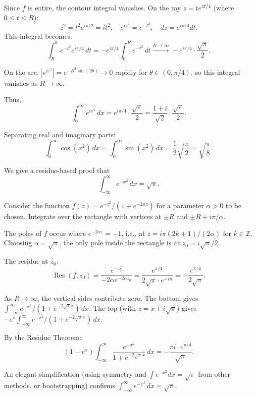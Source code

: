 \begin{example}
  Since $f$ is entire, the contour integral vanishes. On the ray $z = te^{i\pi/4}$ (where $0 \leq t \leq R$):
  \[
    z^2 = t^2 e^{i\pi/2} = it^2, \quad e^{iz^2} = e^{-t^2}, \quad dz = e^{i\pi/4} dt.
  \]
  This integral becomes:
  \[
    \int_R^0 e^{-t^2} e^{i\pi/4} \, dt = -e^{i\pi/4} \int_0^R e^{-t^2} \, dt \xrightarrow{R \to \infty} -e^{i\pi/4} \cdot \frac{\sqrt{\pi}}{2}.
  \]

  On the arc, $|e^{iz^2}| = e^{-R^2 \sin(2\theta)} \to 0$ rapidly for $\theta \in (0, \pi/4)$, so this integral vanishes as $R \to \infty$.

  Thus,
  \[
    \int_0^{\infty} e^{ix^2} \, dx = e^{i\pi/4} \cdot \frac{\sqrt{\pi}}{2} = \frac{1 + i}{\sqrt{2}} \cdot \frac{\sqrt{\pi}}{2}.
  \]

  Separating real and imaginary parts:
  \[
    \boxed{\int_0^{\infty} \cos(x^2) \, dx = \int_0^{\infty} \sin(x^2) \, dx = \frac{1}{2}\sqrt{\frac{\pi}{2}} = \sqrt{\frac{\pi}{8}}.}
  \]
\end{example}

\begin{example}
  We give a residue-based proof that
  \[
    \int_{-\infty}^{\infty} e^{-x^2} \, dx = \sqrt{\pi}.
  \]

  Consider the function $f(z) = e^{-z^2} / (1 + e^{-2\alpha z})$ for a parameter $\alpha > 0$ to be chosen.
  Integrate over the rectangle with vertices at $\pm R$ and $\pm R + i\pi/\alpha$.

  The poles of $f$ occur where $e^{-2\alpha z} = -1$, i.e., at $z = i\pi(2k+1)/(2\alpha)$ for $k \in \mathbb{Z}$.
  Choosing $\alpha = \sqrt{\pi}$, the only pole inside the rectangle is at $z_0 = i\sqrt{\pi}/2$.

  The residue at $z_0$:
  \[
    \operatorname{Res}(f, z_0) = \frac{e^{-z_0^2}}{-2\alpha e^{-2\alpha z_0}} = \frac{e^{\pi/4}}{2\sqrt{\pi} \cdot e^{-i\pi}} = -\frac{e^{\pi/4}}{2\sqrt{\pi}}.
  \]

  As $R \to \infty$, the vertical sides contribute zero. The bottom gives $\int_{-\infty}^{\infty} e^{-x^2}/(1 + e^{-2\sqrt{\pi}x}) \, dx$.
  The top (with $z = x + i\sqrt{\pi}$) gives $-e^{\pi} \int_{-\infty}^{\infty} e^{-x^2}/(1 + e^{-2\sqrt{\pi}x}) \, dx$.

  By the Residue Theorem:
  \[
    (1 - e^{\pi}) \int_{-\infty}^{\infty} \frac{e^{-x^2}}{1 + e^{-2\sqrt{\pi}x}} \, dx = -\frac{\pi i \cdot e^{\pi/4}}{\sqrt{\pi}}.
  \]

  An elegant simplification (using symmetry and $\int e^{-x^2} dx = \sqrt{\pi}$ from other methods, or bootstrapping) confirms $\int_{-\infty}^{\infty} e^{-x^2} \, dx = \sqrt{\pi}$.
\end{example}

